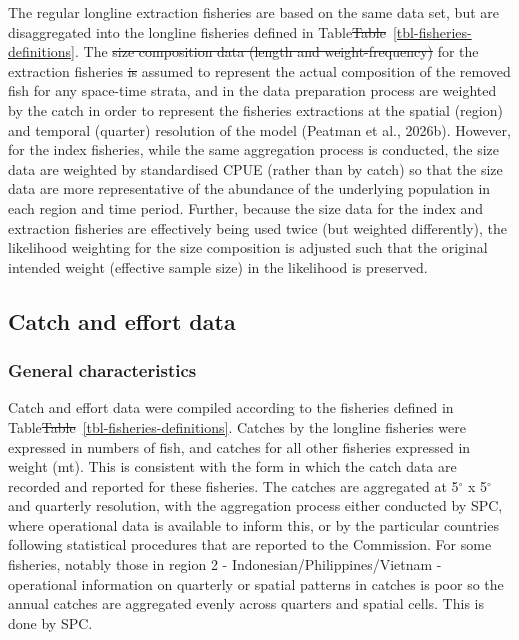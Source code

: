 \documentclass[
  english,
  a4paper,
  a4paper,
  11pt]{SCreport}
\providecommand{\DIFadd}[1]{{\protect\color{blue}\uwave{#1}}} %
\providecommand{\DIFdel}[1]{{\protect\color{red}\sout{#1}}}                      %
\providecommand{\DIFaddbegin}{} %
\providecommand{\DIFaddend}{} %
\providecommand{\DIFdelbegin}{} %
\providecommand{\DIFdelend}{} %
\newcommand{\DIFscaledelfig}{0.5}
\newlength{\DIFdelgraphicswidth} %
\newlength{\DIFdelgraphicsheight} %
\newcommand{\DIFaddincludegraphics}[2][]{{\color{blue}\fbox{\DIFOincludegraphics[#1]{#2}}}} %
\newcommand{\DIFdelincludegraphics}[2][]{%
\sbox{\DIFdelgraphicsbox}{\DIFOincludegraphics[#1]{#2}}%
\settoboxwidth{\DIFdelgraphicswidth}{\DIFdelgraphicsbox} %
\settoboxtotalheight{\DIFdelgraphicsheight}{\DIFdelgraphicsbox} %
\scalebox{\DIFscaledelfig}{%
\parbox[b]{\DIFdelgraphicswidth}{\usebox{\DIFdelgraphicsbox}\\[-\baselineskip] \rule{\DIFdelgraphicswidth}{0em}}\llap{\resizebox{\DIFdelgraphicswidth}{\DIFdelgraphicsheight}{%
\setlength{\unitlength}{\DIFdelgraphicswidth}%
\begin{picture}(1,1)%
\thicklines\linethickness{2pt} %
{\color[rgb]{1,0,0}\put(0,0){\framebox(1,1){}}}%
{\color[rgb]{1,0,0}\put(0,0){\line( 1,1){1}}}%
{\color[rgb]{1,0,0}\put(0,1){\line(1,-1){1}}}%
\end{picture}%
}\hspace*{3pt}}} %
} %
\DeclareRobustCommand{\DIFaddbegin}{\DIFOaddbegin \let\includegraphics\DIFaddincludegraphics} %
\DeclareRobustCommand{\DIFaddend}{\DIFOaddend \let\includegraphics\DIFOincludegraphics} %
\DeclareRobustCommand{\DIFdelbegin}{\DIFOdelbegin \let\includegraphics\DIFdelincludegraphics} %
\DeclareRobustCommand{\DIFdelend}{\DIFOaddend \let\includegraphics\DIFOincludegraphics} %
\begin{document}
The regular longline extraction fisheries are based on the same data
set, but are disaggregated into the longline fisheries defined in
Table\DIFdelbegin \DIFdel{Table}\DIFdelend ~\ref{tbl-fisheries-definitions}. The \DIFdelbegin \DIFdel{size composition data (length
and weight-frequency) }\DIFdelend \DIFaddbegin \DIFadd{length-composition data }\DIFaddend for
the extraction fisheries \DIFdelbegin \DIFdel{is }\DIFdelend \DIFaddbegin \DIFadd{are }\DIFaddend assumed to represent the actual composition
of the removed fish for any space-time strata, and in the data
preparation process are weighted by the catch in order to represent the
fisheries extractions at the spatial (region) and temporal (quarter)
resolution of the model (Peatman et al., 2026b). However, for the index
fisheries, while the same aggregation process is conducted, the size
data are weighted by standardised CPUE (rather than by catch) so that
the size data are more representative of the abundance of the underlying
population in each region and time period. Further, because the size
data for the index and extraction fisheries are effectively being used
twice (but weighted differently), the likelihood weighting for the size
composition is adjusted such that the original intended weight
(effective sample size) in the likelihood is preserved.

\subsection{Catch and effort data}\label{sec-catch-effort-data}

\subsubsection{General characteristics}\label{general-characteristics}

Catch and effort data were compiled according to the fisheries defined
in Table\DIFdelbegin \DIFdel{Table}\DIFdelend ~\ref{tbl-fisheries-definitions}. Catches by the longline
fisheries were expressed in numbers of fish, and catches for all other
fisheries expressed in weight (mt). This is consistent with the form in
which the catch data are recorded and reported for these fisheries. The
catches are aggregated at 5\(^\circ\) x 5\(^\circ\) and quarterly
resolution, with the aggregation process either conducted by SPC, where
operational data is available to inform this, or by the particular
countries following statistical procedures that are reported to the
Commission. For some fisheries, notably those in region 2 -
Indonesian/Philippines/Vietnam - operational information on quarterly or
spatial patterns in catches is poor so the annual catches are aggregated
evenly across quarters and spatial cells. This is done by SPC.
\end{document}
